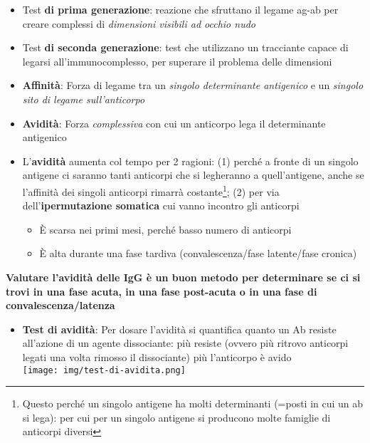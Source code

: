 \documentclass[italian,]{article}
\providecommand{\tightlist}{%
  \setlength{\itemsep}{0pt}\setlength{\parskip}{0pt}}
\newcommand{\normalbox}[2]{\begin{tcolorbox}[title=#1]#2\end{tcolorbox}} %
\begin{document}
\begin{itemize}
  \begin{itemize}
  \tightlist
  \item
    Test \textbf{di prima generazione}: reazione che sfruttano il legame
    ag-ab per creare complessi di \emph{dimensioni visibili ad occhio
    nudo}
  \item
    Test \textbf{di seconda generazione}: test che utilizzano un
    tracciante capace di legarsi all'immunocomplesso, per superare il
    problema delle dimensioni
  \end{itemize}
\end{itemize}

\normalbox{Affinità e avidità anticorpali}{
\begin{itemize}
\item
  \textbf{Affinità}: Forza di legame tra un \emph{singolo determinante
  antigenico} e un \emph{singolo sito di legame sull'anticorpo}
\item
  \textbf{Avidità}: Forza \emph{complessiva} con cui un anticorpo lega
  il determinante antigenico
\item
  L'\textbf{avidità} aumenta col tempo per 2 ragioni: (1) perché a
  fronte di un singolo antigene ci saranno tanti anticorpi che si
  legheranno a quell'antigene, anche se l'affinità dei singoli anticorpi
  rimarrà costante\footnote{Questo perché un singolo antigene ha molti
    determinanti (=posti in cui un ab si lega): per cui per un singolo
    antigene si producono molte famiglie di anticorpi diversi}; (2) per
  via dell'\textbf{ipermutazione somatica} cui vanno incontro gli
  anticorpi

  \begin{itemize}
  \tightlist
  \item
    È scarsa nei primi mesi, perché basso numero di anticorpi
  \item
    È alta durante una fase tardiva (convalescenza/fase latente/fase
    cronica)
  \end{itemize}
\end{itemize}

\tcblower

\textbf{Valutare l'avidità delle IgG è un buon metodo per determinare se
ci si trovi in una fase acuta, in una fase post-acuta o in una fase di
convalescenza/latenza}

\begin{itemize}
\tightlist
\item
\textbf{Test di avidità}: Per dosare l'avidità si quantifica quanto un Ab resiste all'azione di un agente dissociante: più resiste (ovvero più ritrovo anticorpi legati una volta rimosso il dissociante) più l'anticorpo è avido\\
  \texttt{[image: img/test-di-avidita.png]}


\end{itemize}}
\end{document}
